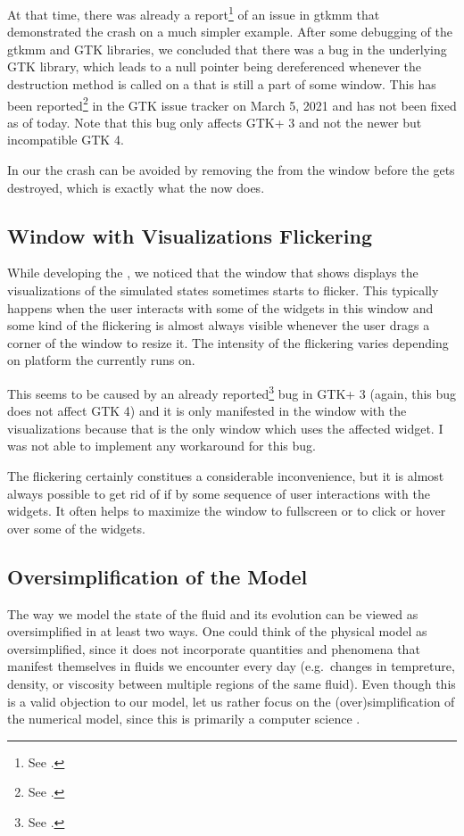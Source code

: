 \documentclass[11pt,a4paper,twoside,openright]{report}
\begin{document}
At that time, there was already a report\footnote{See \cite{GtkmmSwitchReport}.} of an issue in gtkmm that demonstrated the crash on a much simpler example. After some debugging of the gtkmm and GTK libraries, we concluded that there was a bug in the underlying GTK library, which leads to a null pointer being dereferenced whenever the destruction method is called on a  that is still a part of some window. This has been reported\footnote{See \cite{GtkSwitchReport}.} in the GTK issue tracker on March 5, 2021 and has not been fixed as of today. Note that this bug only affects GTK+ 3 and not the newer but incompatible GTK 4.

In our \software{} the crash can be avoided by removing the  from the window before the  gets destroyed, which is exactly what the \software{} now does.

\subsection{Window with Visualizations Flickering}
While developing the \software{}, we noticed that the window that shows displays the visualizations of the simulated states sometimes starts to flicker. This typically happens when the user interacts with some of the widgets in this window and some kind of the flickering is almost always visible whenever the user drags a corner of the window to resize it. The intensity of the flickering varies depending on platform the \software{} currently runs on.

This seems to be caused by an already reported\footnote{See \cite{GtkFlickerReport}.} bug in GTK+ 3 (again, this bug does not affect GTK 4) and it is only manifested in the window with the visualizations because that is the only window which uses the affected  widget. I was not able to implement any workaround for this bug.

The flickering certainly constitues a considerable inconvenience, but it is almost always possible to get rid of if by some sequence of user interactions with the widgets. It often helps to maximize the window to fullscreen or to click or hover over some of the widgets.

\subsection{Oversimplification of the Model}
The way we model the state of the fluid and its evolution can be viewed as oversimplified in at least two ways. One could think of the physical model as oversimplified, since it does not incorporate quantities and phenomena that manifest themselves in fluids we encounter every day (e.g.\ changes in tempreture, density, or viscosity between multiple regions of the same fluid). Even though this is a valid objection to our model, let us rather focus on the (over)simplification of the numerical model, since this \this{} is primarily a computer science \this{}.
\end{document}
